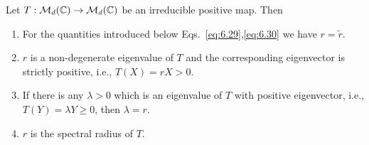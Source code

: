 \documentclass[11pt,a4paper]{article}
\theoremstyle{plain}
\theoremstyle{definition}
\theoremstyle{remark}
\begin{document}
\begin{theorem}
    Let $T:\mathcal{M}_d(\mathbb{C})\to \mathcal{M}_d(\mathbb{C})$ be an irreducible positive map. Then
    \begin{enumerate}
        \item For the quantities introduced below Eqs.~\eqref{eq:6.29},\eqref{eq:6.30}
              we have $r=\tilde r$.
        \item $r$ is a non-degenerate eigenvalue of $T$ and the corresponding eigenvector
              is strictly positive, i.e., $T(X)=rX>0$.
        \item If there is any $\lambda>0$ which is an eigenvalue of $T$ with positive
              eigenvector, i.e., $T(Y)=\lambda Y\ge 0$, then $\lambda=r$.
        \item $r$ is the spectral radius of $T$.
    \end{enumerate}
\end{theorem}
\end{document}
